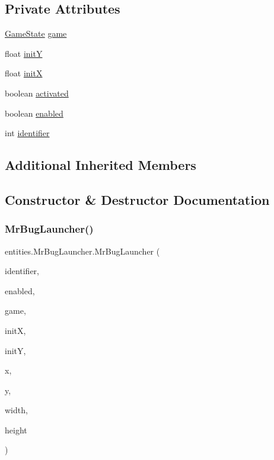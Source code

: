 \subsection*{Private Attributes}
\begin{DoxyCompactItemize}
\item 
\mbox{\hyperlink{classstates_1_1_game_state}{Game\+State}} \mbox{\hyperlink{classentities_1_1_mr_bug_launcher_add442b81d844af299fb25599051e4d33}{game}}
\item 
float \mbox{\hyperlink{classentities_1_1_mr_bug_launcher_a328d350bac019351356862476e8d8633}{initY}}
\item 
float \mbox{\hyperlink{classentities_1_1_mr_bug_launcher_aa421d56d0611c8922cdbde7bb29389bd}{initX}}
\item 
boolean \mbox{\hyperlink{classentities_1_1_mr_bug_launcher_a97b6ded43c1c807ab79f8641348f41c9}{activated}}
\item 
boolean \mbox{\hyperlink{classentities_1_1_mr_bug_launcher_a7a137e2093be1b7ebc830d8c10db42b1}{enabled}}
\item 
int \mbox{\hyperlink{classentities_1_1_mr_bug_launcher_aa9cb24696faf408110cd4bcbfb0dd6e0}{identifier}}
\end{DoxyCompactItemize}
\subsection*{Additional Inherited Members}


\subsection{Constructor \& Destructor Documentation}
\mbox{\label{classentities_1_1_mr_bug_launcher_a2719be79c4eef1d1bf1ce74747883250}} 
\subsubsection{\texorpdfstring{Mr\+Bug\+Launcher()}{MrBugLauncher()}}
{\footnotesize\ttfamily entities.\+Mr\+Bug\+Launcher.\+Mr\+Bug\+Launcher (\begin{DoxyParamCaption}\item[{int}]{identifier,  }\item[{boolean}]{enabled,  }\item[{\mbox{\hyperlink{classstates_1_1_game_state}{Game\+State}}}]{game,  }\item[{float}]{initX,  }\item[{float}]{initY,  }\item[{float}]{x,  }\item[{float}]{y,  }\item[{float}]{width,  }\item[{float}]{height }\end{DoxyParamCaption})\hspace{0.3cm}{\ttfamily [inline]}}


